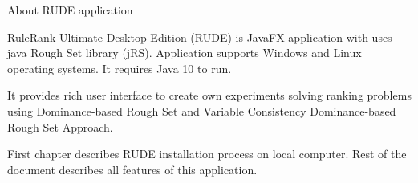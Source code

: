 \begin{Large}
	About RUDE application
\end{Large}
\newline

RuleRank Ultimate Desktop Edition (RUDE) is JavaFX application with uses java Rough Set library (jRS). Application supports Windows and Linux operating systems. It requires Java 10 to run.
\newline

It provides rich user interface to create own experiments solving ranking problems using Dominance-based Rough Set and Variable Consistency Dominance-based Rough Set Approach.
\newline

First chapter describes RUDE installation process on local computer. Rest of the document describes all features of this application.

\vfill\newpage